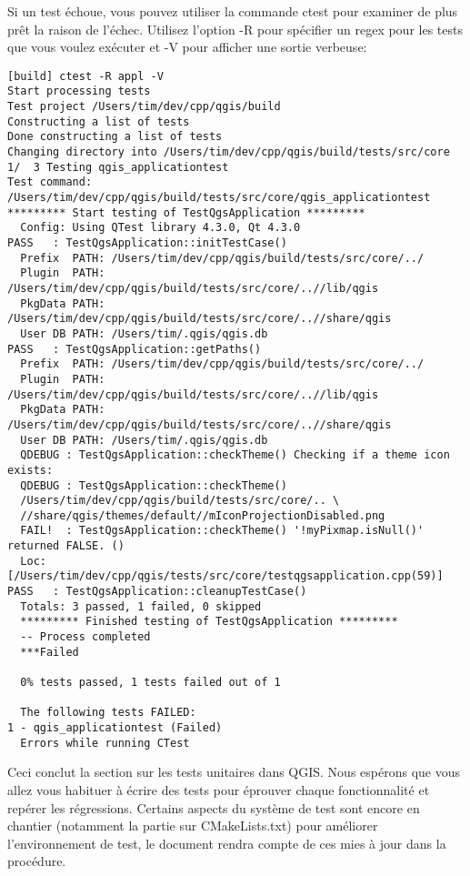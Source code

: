 Si un test échoue, vous pouvez utiliser la commande ctest pour examiner de plus prêt la raison de l'échec. Utilisez l'option -R pour spécifier un regex pour les tests que vous voulez exécuter et -V pour afficher une sortie verbeuse:

\begin{verbatim}
[build] ctest -R appl -V
Start processing tests
Test project /Users/tim/dev/cpp/qgis/build
Constructing a list of tests
Done constructing a list of tests
Changing directory into /Users/tim/dev/cpp/qgis/build/tests/src/core
1/  3 Testing qgis_applicationtest          
Test command: /Users/tim/dev/cpp/qgis/build/tests/src/core/qgis_applicationtest
********* Start testing of TestQgsApplication *********
  Config: Using QTest library 4.3.0, Qt 4.3.0
PASS   : TestQgsApplication::initTestCase()
  Prefix  PATH: /Users/tim/dev/cpp/qgis/build/tests/src/core/../
  Plugin  PATH: /Users/tim/dev/cpp/qgis/build/tests/src/core/..//lib/qgis
  PkgData PATH: /Users/tim/dev/cpp/qgis/build/tests/src/core/..//share/qgis
  User DB PATH: /Users/tim/.qgis/qgis.db
PASS   : TestQgsApplication::getPaths()
  Prefix  PATH: /Users/tim/dev/cpp/qgis/build/tests/src/core/../
  Plugin  PATH: /Users/tim/dev/cpp/qgis/build/tests/src/core/..//lib/qgis
  PkgData PATH: /Users/tim/dev/cpp/qgis/build/tests/src/core/..//share/qgis
  User DB PATH: /Users/tim/.qgis/qgis.db
  QDEBUG : TestQgsApplication::checkTheme() Checking if a theme icon exists:
  QDEBUG : TestQgsApplication::checkTheme() 
  /Users/tim/dev/cpp/qgis/build/tests/src/core/.. \
  //share/qgis/themes/default//mIconProjectionDisabled.png
  FAIL!  : TestQgsApplication::checkTheme() '!myPixmap.isNull()' returned FALSE. ()
  Loc: [/Users/tim/dev/cpp/qgis/tests/src/core/testqgsapplication.cpp(59)]
PASS   : TestQgsApplication::cleanupTestCase()
  Totals: 3 passed, 1 failed, 0 skipped
  ********* Finished testing of TestQgsApplication *********
  -- Process completed
  ***Failed

  0% tests passed, 1 tests failed out of 1

  The following tests FAILED:
1 - qgis_applicationtest (Failed)
  Errors while running CTest

\end{verbatim}

Ceci conclut la section sur les tests unitaires dans QGIS. Nous espérons que vous allez vous habituer à écrire des tests pour éprouver chaque fonctionnalité et repérer les régressions. Certains aspects du système de test sont encore en chantier (notamment la partie sur CMakeLists.txt) pour améliorer l'environnement de test, le document rendra compte de ces mies à jour dans la procédure.

